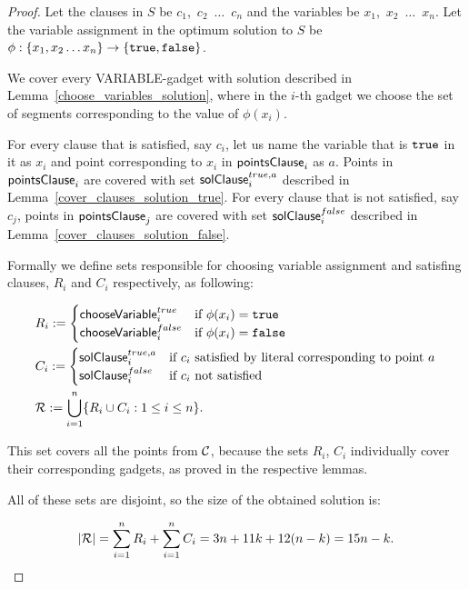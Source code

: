 \begin{proof}
Let the clauses in $S$ be $c_1$,~$c_2$~$\ldots$~$c_n$
and the variables be $x_1$,~$x_2$~$\ldots$~$x_n$.
Let the variable assignment in
the optimum solution to $S$ be
$\phi : \{ x_1, x_2 \ldots x_n\} \rightarrow \{\texttt{true}, \texttt{false}\}$.


We cover every VARIABLE-gadget with solution described in
Lemma~\ref{choose_variables_solution}, where
in the $i$-th gadget we choose the set of segments corresponding to the
value of $\phi(x_i)$.

For every clause that is satisfied, say $c_i$, 
let us name the variable that is $\texttt{true}$ in it as $x_i$
and point corresponding to $x_i$ in $\mathsf{pointsClause}_{i}$ as $a$.
Points in $\mathsf{pointsClause}_{i}$ 
are covered with set $\mathsf{solClause}^{true,a}_i$ described in
Lemma~\ref{cover_clauses_solution_true}.
For every clause that is not satisfied, say $c_j$,
points in $\mathsf{pointsClause}_{j}$ are covered
with set $\mathsf{solClause}^{false}_i$ described in
Lemma~\ref{cover_clauses_solution_false}.

Formally we define 
sets responsible for choosing variable assignment and satisfing clauses,
$R_i$ and $C_i$ respectively, as following:

\begin{align}
	\begin{split}
	& R_i := \begin{cases}
		\mathsf{chooseVariable}^{true}_{i} & \text{if}\ \phi(x_i) = \texttt{true} \\
		\mathsf{chooseVariable}^{false}_{i} & \text{if}\ \phi(x_i) = \texttt{false} \\
		\end{cases} \\
	& C_i := \begin{cases}
		\mathsf{solClause}^{true,a}_i & \text{if}\ c_i \text{ satisfied by literal corresponding to point } a \\
		\mathsf{solClause}^{false}_i & \text{if}\ c_i \text{ not satisfied}
		\end{cases} \\
	& \mathcal{R} := \bigcup\limits_{i=1}^{n} \{R_i \cup C_i : 1 \le i \le n\}.
    \end{split}
\end{align}


This set covers all the points from $\mathcal{C}$, because
the sets $R_i$, $C_i$ individually cover their corresponding gadgets,
as proved in the respective lemmas.

All of these sets are disjoint, so the size of the obtained solution is:

$$|\mathcal{R}| = \sum_{i=1}^{n} R_i + \sum_{i=1}^n C_i = 3n + 11k + 12(n-k) = 15n - k.\qedhere$$
\end{proof}

